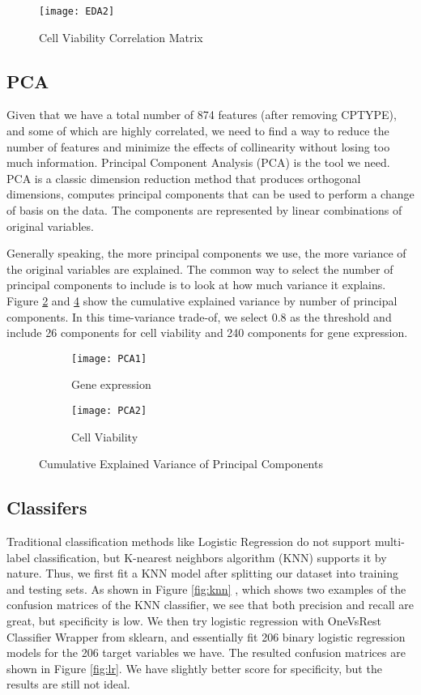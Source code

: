 \documentclass[11.5pt]{article}
\begin{document}
\begin{figure}[htb]
  \centering
    \texttt{[image: EDA2]}
  \caption{Cell Viability Correlation Matrix}
  \label{fig:eda2}
\end{figure}



\subsection{PCA}

Given that we have a total number of 874 features (after removing CPTYPE), and some of which are highly correlated, we need to find a way to reduce the number of features and minimize the effects of collinearity without losing too much information. Principal Component Analysis (PCA) is the tool we need. PCA is a classic dimension reduction method that produces orthogonal dimensions, computes principal components that can be used to perform a change of basis on the data. The components are represented by linear combinations of original variables. 

Generally speaking, the more principal components we use, the more variance of the original variables are explained. The common way to select the number of principal components to include is to look at how much variance it explains. Figure \ref{fig:pca1} and \ref{fig:pca2} show the cumulative explained variance by number of principal components. In this time-variance trade-of, we select 0.8 as the threshold and include 
26 components for cell viability and 240 components for gene expression.
 
\begin{figure}[htb]
\begin{subfigure}[b]{0.5\textwidth}
  \texttt{[image: PCA1]}
  \caption{Gene expression}
  \label{fig:pca1}
  \end{subfigure}
  \begin{subfigure}[b]{0.5\textwidth}
  \texttt{[image: PCA2]}
   \caption{Cell Viability}
  \label{fig:pca2}
  \end{subfigure}
\caption{Cumulative Explained Variance of Principal Components}
\end{figure}


\subsection{Classifers}

Traditional classification methods like Logistic Regression do not support multi-label classification, but K-nearest neighbors algorithm (KNN) supports it by nature. Thus, we first fit a KNN model after splitting our dataset into training and testing sets. As shown in Figure \ref{fig:knn} , which shows two examples of the confusion matrices of the KNN classifier, we see that both precision and recall are great, but specificity is low. We then try logistic regression with OneVsRest Classifier Wrapper from sklearn, and essentially fit 206 binary logistic regression models for the 206 target variables we have. The resulted confusion matrices are shown in Figure \ref{fig:lr}. We have slightly better score for specificity, but the results are still not ideal. 
\end{document}
